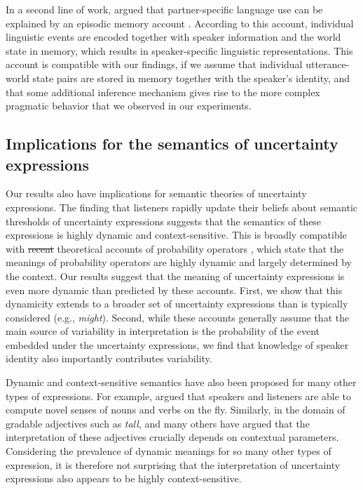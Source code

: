 \documentclass[man, floatsintext]{apa6}
\providecommand{\DIFadd}[1]{{\protect\color{blue}\uwave{#1}}} %
\providecommand{\DIFdel}[1]{{\protect\color{red}\sout{#1}}}                      %
\providecommand{\DIFaddbegin}{} %
\providecommand{\DIFaddend}{} %
\providecommand{\DIFdelbegin}{} %
\providecommand{\DIFdelend}{} %
\newcommand{\DIFscaledelfig}{0.5}
\newlength{\DIFdelgraphicswidth} %
\newlength{\DIFdelgraphicsheight} %
\newcommand{\DIFaddincludegraphics}[2][]{{\color{blue}\fbox{\DIFOincludegraphics[#1]{#2}}}} %
\newcommand{\DIFdelincludegraphics}[2][]{%
\sbox{\DIFdelgraphicsbox}{\DIFOincludegraphics[#1]{#2}}%
\settoboxwidth{\DIFdelgraphicswidth}{\DIFdelgraphicsbox} %
\settoboxtotalheight{\DIFdelgraphicsheight}{\DIFdelgraphicsbox} %
\scalebox{\DIFscaledelfig}{%
\parbox[b]{\DIFdelgraphicswidth}{\usebox{\DIFdelgraphicsbox}\\[-\baselineskip] \rule{\DIFdelgraphicswidth}{0em}}\llap{\resizebox{\DIFdelgraphicswidth}{\DIFdelgraphicsheight}{%
\setlength{\unitlength}{\DIFdelgraphicswidth}%
\begin{picture}(1,1)%
\thicklines\linethickness{2pt} %
{\color[rgb]{1,0,0}\put(0,0){\framebox(1,1){}}}%
{\color[rgb]{1,0,0}\put(0,0){\line( 1,1){1}}}%
{\color[rgb]{1,0,0}\put(0,1){\line(1,-1){1}}}%
\end{picture}%
}\hspace*{3pt}}} %
} %
\DeclareRobustCommand{\DIFaddbegin}{\DIFOaddbegin \let\includegraphics\DIFaddincludegraphics} %
\DeclareRobustCommand{\DIFaddend}{\DIFOaddend \let\includegraphics\DIFOincludegraphics} %
\DeclareRobustCommand{\DIFdelbegin}{\DIFOdelbegin \let\includegraphics\DIFdelincludegraphics} %
\DeclareRobustCommand{\DIFdelend}{\DIFOaddend \let\includegraphics\DIFOincludegraphics} %
\begin{document}
In a second line of work, \textcite{Horton2005,Horton2016} argued that partner-specific
language use can be explained by an episodic memory account \parencite{Goldinger1998,Johnson1997,Pierrehumbert2001}.
According to this account, individual linguistic events are encoded together with
speaker information and the world state in memory, which results in speaker-specific
linguistic representations. This account is compatible with our findings, if we assume
that individual utterance-world state pairs are stored in memory together with the speaker's 
identity, and that some additional inference mechanism gives rise to the more complex
pragmatic behavior that we observed in our experiments.



\subsection{Implications for the semantics of uncertainty expressions}

Our results also have implications for semantic theories of uncertainty expressions.
The finding that listeners rapidly update their beliefs about semantic thresholds of uncertainty expressions
suggests that the semantics of these expressions is highly dynamic and context-sensitive. This is broadly compatible with 
\DIFdelbegin \DIFdel{recent 
}\DIFdelend theoretical accounts of probability operators \DIFdelbegin %
\DIFdelend \DIFaddbegin \parencite[a subset of uncertainty expressions; e.g.,][]{Yalcin2010}\DIFaddend , which 
state that the meanings of probability operators are highly dynamic and largely determined by the context. Our results
suggest that the meaning of uncertainty expressions is even more dynamic than predicted by these accounts. First, we show that this dynamicity 
extends to a broader set of uncertainty expressions than is typically considered (e.g., \textit{might})\DIFaddbegin \DIFadd{, as has been recently also argued by \textcite{Lassiter2016}}\DIFaddend . 
Second, while these accounts generally assume 
that the main source of variability in interpretation is the probability of the event
embedded under the uncertainty expressions, we find that knowledge of speaker identity also  importantly contributes variability.

Dynamic and context-sensitive semantics have also been proposed for many other types of expressions.
For example, \textcite{Clark1983} argued that speakers and listeners
are able to compute novel senses of nouns and verbs on the fly. Similarly, in the domain of gradable adjectives such as \textit{tall},
 \textcite{Kennedy2007} and many others have argued that the interpretation of these adjectives crucially depends on contextual
 parameters. Considering the prevalence of dynamic meanings for so many other types of expression, it is therefore not 
 surprising that the interpretation of uncertainty expressions also appears to be highly context-sensitive.
\end{document}
